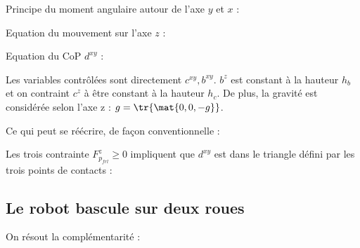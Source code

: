 			Principe du moment angulaire autour de l'axe $y$ et $x$ :
			
			Equation du mouvement sur l'axe $z$ :
		
		
			Equation du CoP $d^{xy}$ :
			
			
			
			Les variables contrôlées sont directement $c^{xy}, b^{xy}$. $b^z$ est constant à la hauteur $h_b$ et on contraint $c^z$ à être constant à la hauteur $h_c$.
			De plus, la gravité est considérée selon l'axe z : $g=\tr{\mat{0, 0, -g}}$.
			
			
			Ce qui peut se réécrire, de façon conventionnelle :
			
			
			Les trois contrainte $F_{p_{frl}}^z \ge 0$ impliquent que $d^{xy}$ est dans le triangle défini par les trois points de contacts :
		
		\subsection{Le robot bascule sur deux roues}

			On résout la complémentarité :
			
